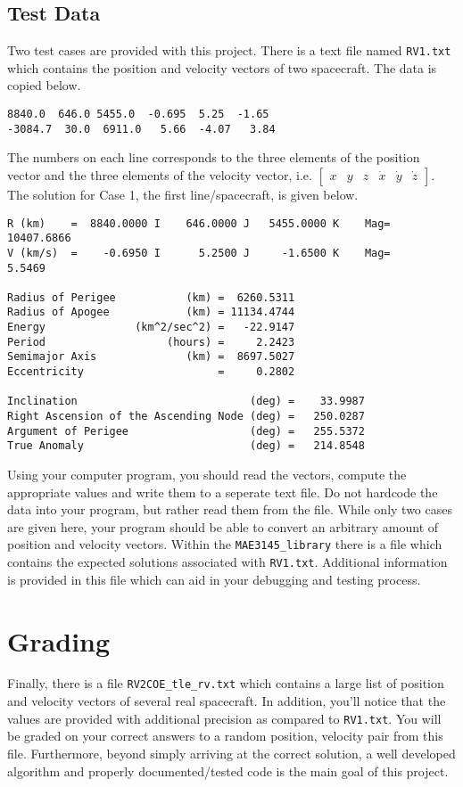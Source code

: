 \documentclass[11pt, reqno]{article}    %
\begin{document}
\subsection*{Test Data}
Two test cases are provided with this project. 
There is a text file named \texttt{RV1.txt} which contains the position and velocity vectors of two spacecraft. 
The data is copied below.
\begin{verbatim}
8840.0  646.0 5455.0  -0.695  5.25  -1.65
-3084.7  30.0  6911.0   5.66  -4.07   3.84 
\end{verbatim}
The numbers on each line corresponds to the three elements of the position vector and the three elements of the velocity vector, i.e. \(\begin{bmatrix} x & y & z & \dot{x} & \dot{y} & \dot{z} \end{bmatrix}\).
The solution for Case 1, the first line/spacecraft, is given below.
\begin{verbatim}
R (km)    =  8840.0000 I    646.0000 J   5455.0000 K    Mag= 10407.6866
V (km/s)  =    -0.6950 I      5.2500 J     -1.6500 K    Mag=     5.5469

Radius of Perigee           (km) =  6260.5311
Radius of Apogee            (km) = 11134.4744
Energy              (km^2/sec^2) =   -22.9147
Period                   (hours) =     2.2423
Semimajor Axis              (km) =  8697.5027
Eccentricity                     =     0.2802

Inclination                           (deg) =    33.9987
Right Ascension of the Ascending Node (deg) =   250.0287
Argument of Perigee                   (deg) =   255.5372
True Anomaly                          (deg) =   214.8548
\end{verbatim}

Using your computer program, you should read the vectors, compute the appropriate values and write them to a seperate text file.
Do not hardcode the data into your program, but rather read them from the file. 
While only two cases are given here, your program should be able to convert an arbitrary amount of position and velocity vectors.
Within the \texttt{MAE3145\_library} there is a file which contains the expected solutions associated with \texttt{RV1.txt}. 
Additional information is provided in this file which can aid in your debugging and testing process. 

\section*{Grading}
Finally, there is a file \texttt{RV2COE\_tle\_rv.txt} which contains a large list of position and velocity vectors of several real spacecraft. 
In addition, you'll notice that the values are provided with additional precision as compared to \texttt{RV1.txt}. 
You will be graded on your correct answers to a random position, velocity pair from this file. 
Furthermore, beyond simply arriving at the correct solution, a well developed algorithm and properly documented/tested code is the main goal of this project.
\end{document}
